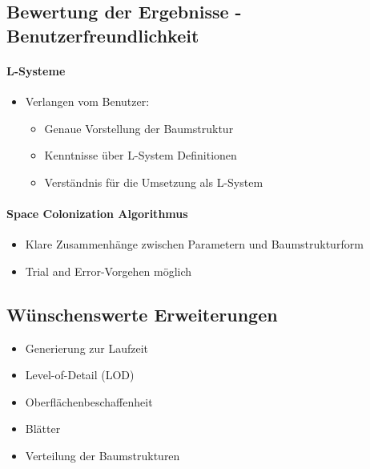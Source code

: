 \newpage
\subsection{Bewertung der Ergebnisse - Benutzerfreundlichkeit\\}

\paragraph{L-Systeme}
\begin{itemize}
	\item Verlangen vom Benutzer:
	\begin{itemize}
		\item Genaue Vorstellung der Baumstruktur
		\item Kenntnisse über L-System Definitionen
		\item Verständnis für die Umsetzung als L-System
	\end{itemize}
\end{itemize}


\paragraph{Space Colonization Algorithmus}
\begin{itemize}
	\item Klare Zusammenhänge zwischen Parametern und Baumstrukturform
	
	\item \glqq Trial and Error\grqq-Vorgehen möglich
\end{itemize}




\newpage
{}
\subsection{Wünschenswerte Erweiterungen\\}

\begin{itemize}
	\item Generierung zur Laufzeit\\
	
	\item Level-of-Detail (LOD)\\
	
	\item Oberflächenbeschaffenheit\\
	
	\item Blätter\\
	
	\item Verteilung der Baumstrukturen
\end{itemize}





\newpage
{}
\nocite{*}




